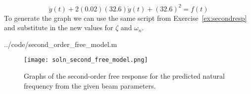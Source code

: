\ifsolutions
\begin{soln}
\[
\ddot{y}(t) + 2 (0.02) (32.6)\dot{y}(t) + (32.6)^2 = f(t)
\]
To generate the graph we can use the same script from Exercise~\ref{ex:secondresp} and substitute in the new values for $\zeta$ and $\omega_n$.


{../code/second_order_free_model.m}

\begin{figure}[hbt]
\centering
\texttt{[image: soln\_second\_free\_model.png]}
\caption{Graphs of the second-order free response for the predicted natural frequency from the given beam parameters.}
\label{f:soln2freemodel}
\end{figure}

\end{soln}
\fi
